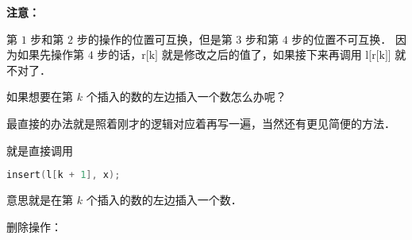 \textbf{注意：}

第 $1$ 步和第 $2$ 步的操作的位置可互换，但是第 $3$ 步和第 $4$ 步的位置不可互换．
因为如果先操作第 $4$ 步的话，$\text{r[k]}$ 就是修改之后的值了，如果接下来再调用 $\text{l[r[k]]}$ 就不对了．

如果想要在第 $k$ 个插入的数的左边插入一个数怎么办呢？

最直接的办法就是照着刚才的逻辑对应着再写一遍，当然还有更见简便的方法．

就是直接调用 \begin{lstlisting}[language=cpp]
insert(l[k + 1], x);
\end{lstlisting}
意思就是在第 $k$ 个插入的数的左边插入一个数．

删除操作：